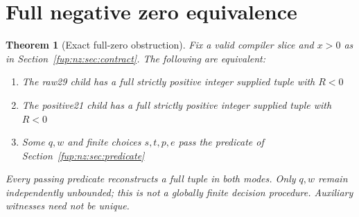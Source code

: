 \documentclass[11pt,letterpaper]{article}
\newtheorem{theorem}{Theorem}[section]
\theoremstyle{definition}\newtheorem{definition}[theorem]{Definition}
\theoremstyle{remark}\newtheorem{remark}[theorem]{Remark}
\begin{document}
\section{Full negative zero equivalence}\label{fup:nz:sec:theorem}
\begin{theorem}[Exact full-zero obstruction]\label{fup:nz:thm:main}
Fix a valid compiler slice and $x>0$ as in Section~\ref{fup:nz:sec:contract}. The following are equivalent:
\begin{enumerate}
\item The raw29 child has a full strictly positive integer supplied tuple with $R<0$
\item The positive21 child has a full strictly positive integer supplied tuple with $R<0$
\item Some $q,w$ and finite choices $s,t,p,e$ pass the predicate of Section~\ref{fup:nz:sec:predicate}
\end{enumerate}
Every passing predicate reconstructs a full tuple in both modes. Only $q,w$ remain independently unbounded; this is not a globally finite decision procedure. Auxiliary witnesses need not be unique.
\end{theorem}
\end{document}
